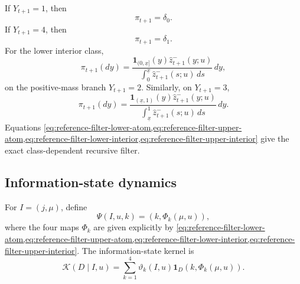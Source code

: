 \documentclass[10pt,twocolumn]{article}
\theoremstyle{remark}
\newcommand{\one}{\mathbf{1}}
\begin{document}
If \(Y_{t+1}=1\), then
\begin{equation}
	\pi_{t+1}=\delta_0.
	\label{eq:reference-filter-lower-atom}
\end{equation}
If \(Y_{t+1}=4\), then
\begin{equation}
	\pi_{t+1}=\delta_1.
	\label{eq:reference-filter-upper-atom}
\end{equation}
For the lower interior class,
\begin{equation}
	\pi_{t+1}(dy)
	=
	\frac{
		\one_{(0,\underline x]}(y)
		\widehat z_{t+1}^{-}(y;u)
	}{
		\displaystyle
		\int_0^{\underline x}
		\widehat z_{t+1}^{-}(s;u)\,ds
	}
	\,dy,
	\label{eq:reference-filter-lower-interior}
\end{equation}
on the positive-mass branch \(Y_{t+1}=2\). Similarly, on \(Y_{t+1}=3\),
\begin{equation}
	\pi_{t+1}(dy)
	=
	\frac{
		\one_{(\underline x,1)}(y)
		\widehat z_{t+1}^{-}(y;u)
	}{
		\displaystyle
		\int_{\underline x}^{1}
		\widehat z_{t+1}^{-}(s;u)\,ds
	}
	\,dy.
	\label{eq:reference-filter-upper-interior}
\end{equation}
Equations
\cref{eq:reference-filter-lower-atom,eq:reference-filter-upper-atom,eq:reference-filter-lower-interior,eq:reference-filter-upper-interior}
give the exact class-dependent recursive filter.

\subsection{Information-state dynamics}
\label{subsec:reference-information-dynamics}

For \(I=(j,\mu)\), define
\begin{equation*}
	\Psi(I,u,k)
	=
	\left(k,\Phi_k(\mu,u)\right),
	\label{eq:reference-information-update}
\end{equation*}
where the four maps \(\Phi_k\) are given explicitly by
\cref{eq:reference-filter-lower-atom,eq:reference-filter-upper-atom,eq:reference-filter-lower-interior,eq:reference-filter-upper-interior}.
The information-state kernel is
\begin{equation*}
	\mathcal K(D\mid I,u)
	=
	\sum_{k=1}^{4}
	\vartheta_k(I,u)
	\one_D\!\left(
	k,\Phi_k(\mu,u)
	\right).
	\label{eq:reference-information-kernel}
\end{equation*}
\end{document}
